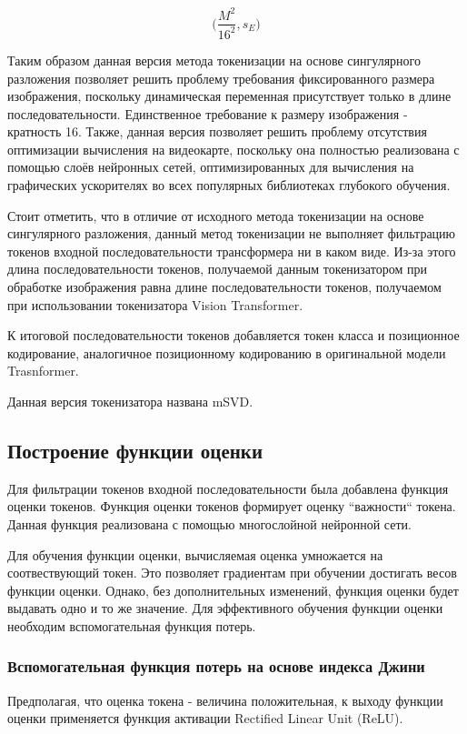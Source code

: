 \documentclass[times,specification,annotation]{itmo-student-thesis}
\begin{document}
$$
\Big(\dfrac{M^2}{16^2}, s_E\Big)
$$

Таким образом данная версия метода токенизации на основе сингулярного разложения позволяет решить проблему требования фиксированного размера изображения, поскольку динамическая переменная присутствует только в длине последовательности. Единственное требование к размеру изображения - кратность 16. Также, данная версия позволяет решить проблему отсутствия оптимизации вычисления на видеокарте, поскольку она полностью реализована с помощью слоёв нейронных сетей, оптимизированных для вычисления на графических ускорителях во всех популярных библиотеках глубокого обучения. 

Стоит отметить, что в отличие от исходного метода токенизации на основе сингулярного разложения, данный метод токенизации не выполняет фильтрацию токенов входной последовательности трансформера ни в каком виде. Из-за этого длина последовательности токенов, получаемой данным токенизатором при обработке изображения равна длине последовательности токенов, получаемом при использовании токенизатора Vision Transformer.

К итоговой последовательности токенов добавляется токен класса и позиционное кодирование, аналогичное позиционному кодированию в оригинальной модели Trasnformer.

Данная версия токенизатора названа mSVD.

\subsection{Построение функции оценки}
Для фильтрации токенов входной последовательности была добавлена функция оценки токенов. Функция оценки токенов формирует оценку ``важности`` токена. Данная функция реализована с помощью многослойной нейронной сети.

Для обучения функции оценки, вычисляемая оценка умножается на соотвествующий токен. Это позволяет градиентам при обучении достигать весов функции оценки. Однако, без дополнительных изменений, функция оценки будет выдавать одно и то же значение. Для эффективного обучения функции оценки необходим вспомогательная функция потерь.

\subsubsection{Вспомогательная функция потерь на основе индекса Джини}
Предполагая, что оценка токена - величина положительная, к выходу функции оценки применяется функция активации Rectified Linear Unit (ReLU). 
\end{document}
